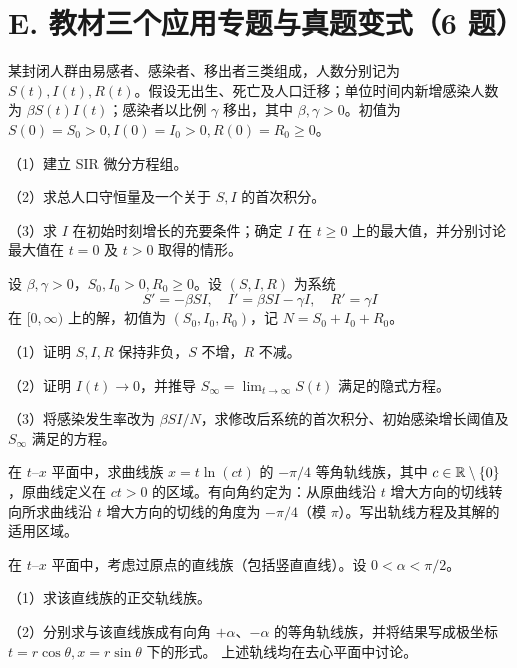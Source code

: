 \section{E. 教材三个应用专题与真题变式（6 题）}
\noindent\begin{minipage}{\linewidth}
某封闭人群由易感者、感染者、移出者三类组成，人数分别记为 $S(t),I(t),R(t)$。假设无出生、死亡及人口迁移；单位时间内新增感染人数为 $\beta S(t)I(t)$；感染者以比例 $\gamma$ 移出，其中 $\beta,\gamma>0$。初值为 $S(0)=S_0>0,I(0)=I_0>0,R(0)=R_0\ge0$。
\par（1）建立 SIR 微分方程组。
\par（2）求总人口守恒量及一个关于 $S,I$ 的首次积分。
\par（3）求 $I$ 在初始时刻增长的充要条件；确定 $I$ 在 $t\ge0$ 上的最大值，并分别讨论最大值在 $t=0$ 及 $t>0$ 取得的情形。
\end{minipage}\par\vspace{5pt}
\noindent\begin{minipage}{\linewidth}
设 $\beta,\gamma>0$，$S_0,I_0>0,R_0\ge0$。设 $(S,I,R)$ 为系统
\[S'=-\beta SI,\quad I'=\beta SI-\gamma I,\quad R'=\gamma I\]
在 $[0,\infty)$ 上的解，初值为 $(S_0,I_0,R_0)$，记 $N=S_0+I_0+R_0$。
\par（1）证明 $S,I,R$ 保持非负，$S$ 不增，$R$ 不减。
\par（2）证明 $I(t)\to0$，并推导 $S_\infty=\lim_{t\to\infty}S(t)$ 满足的隐式方程。
\par（3）将感染发生率改为 $\beta SI/N$，求修改后系统的首次积分、初始感染增长阈值及 $S_\infty$ 满足的方程。
\end{minipage}\par\vspace{5pt}
\noindent\begin{minipage}{\linewidth}
在 $t$--$x$ 平面中，求曲线族 $x=t\ln(ct)$ 的 $-\pi/4$ 等角轨线族，其中 $c\in\mathbb R\setminus\{0\}$，原曲线定义在 $ct>0$ 的区域。有向角约定为：从原曲线沿 $t$ 增大方向的切线转向所求曲线沿 $t$ 增大方向的切线的角度为 $-\pi/4$（模 $\pi$）。写出轨线方程及其解的适用区域。
\end{minipage}\par\vspace{5pt}
\noindent\begin{minipage}{\linewidth}
在 $t$--$x$ 平面中，考虑过原点的直线族（包括竖直直线）。设 $0<\alpha<\pi/2$。
\par（1）求该直线族的正交轨线族。
\par（2）分别求与该直线族成有向角 $+\alpha$、$-\alpha$ 的等角轨线族，并将结果写成极坐标 $t=r\cos\theta,x=r\sin\theta$ 下的形式。
上述轨线均在去心平面中讨论。
\end{minipage}\par\vspace{5pt}
